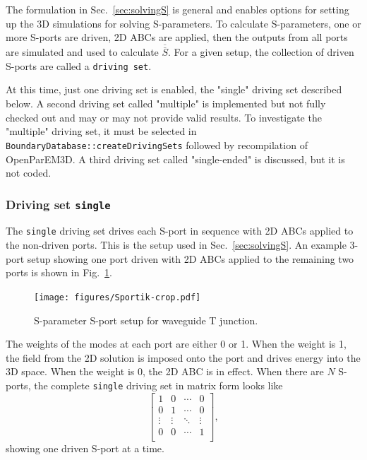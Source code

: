 \documentclass[titlepage]{article}
\renewcommand\_{\textunderscore\linebreak[1]}
\begin{document}
The formulation in Sec.~\ref{sec:solvingS} is general and enables options for setting up the 3D simulations for solving S-parameters.  To calculate S-parameters, one or more S-ports are driven, 2D ABCs are applied, then the outputs from all ports are simulated and used to calculate $\overline{\overline{S}}$.  For a given setup, the collection of driven S-ports are called a \texttt{driving set}.

At this time, just one driving set is enabled, the "single" driving set described below.  A second driving set called "multiple" is implemented but not fully checked out and may or may not provide valid results.  To investigate the "multiple" driving set, it must be selected in \texttt{BoundaryDatabase::createDrivingSets} followed by recompilation of OpenParEM3D.  A third driving set called "single-ended" is discussed, but it is not coded.

\subsubsection{Driving set \texttt{single}}

The \texttt{single} driving set drives each S-port in sequence with 2D ABCs applied to the non-driven ports.  This is the setup used in Sec.~\ref{sec:solvingS}.  An example 3-port setup showing one port driven with 2D ABCs applied to the remaining two ports is shown in Fig.~\ref{fig:Sportik}.

\begin{figure}
  \centering
  \texttt{[image: figures/Sportik-crop.pdf]}
  \caption{S-parameter S-port setup for waveguide T junction.}
  \label{fig:Sportik}
\end{figure}

The weights of the modes at each port are either 0 or 1.  When the weight is 1, the field from the 2D solution is imposed onto the port and drives energy into the 3D space.  When the weight is 0, the 2D ABC is in effect.  When there are $N$ S-ports, the complete \texttt{single} driving set in matrix form looks like
\begin{equation}
\left[ \begin{array}{cccc}
  1 & 0 & \cdots & 0 \\
  0 & 1 & \cdots & 0 \\
  \vdots & \vdots & \ddots & \vdots \\
  0 & 0 & \cdots & 1 \\
\end{array} \right],
\end{equation}
showing one driven S-port at a time.
\end{document}
